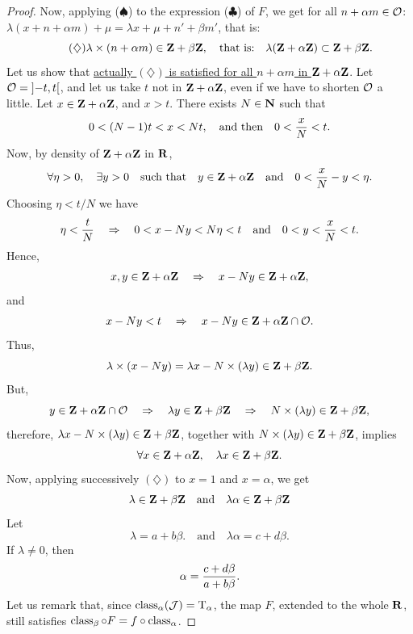 \begin{proof}
  Now, applying ($\spadesuit$) to the expression ($\clubsuit$) of $F$,
  we get for all $n + \alpha m \in \mathcal{O}$:
  $\lambda(x + n + \alpha m) + \mu = \lambda x + \mu  + n' + \beta m'$,
  that is:
  \begin{equation} \tag{$\diamondsuit$}
    \lambda \times (n + \alpha m ) \in \mathbf{Z} + \beta \mathbf{Z},
    \quad \text{that is:} \quad
    \lambda (\mathbf{Z} + \alpha \mathbf{Z}) \subset \mathbf{Z} + \beta \mathbf{Z}.
  \end{equation}
  Let us show that \uline{actually $(\diamondsuit)$ is satisfied for all $n + \alpha m$ in $\mathbf{Z} + \alpha \mathbf{Z}$}.
  Let $\mathcal{O} = \mathopen] -t,t \mathclose[$,
  and let us take $t$ not in $\mathbf{Z} + \alpha \mathbf{Z}$,
  even if we have to shorten $\mathcal{O}$ a little.
  Let $x \in \mathbf{Z} + \alpha \mathbf{Z}$,
  and $x >t$.
  There exists $N \in \mathbf{N}$ such that
  $$%
    0 < (N-1)t < x < N t,
    \quad \text{and then} \quad
    0< {x \over N} < t.
    $$%
  Now, by density of $\mathbf{Z} + \alpha \mathbf{Z}$ in $\mathbf{R}$,
  $$%
    \forall  \eta >0, \quad \exists y > 0 \quad \text{such that} \quad y \in \ZZ + \alpha \ZZ \quad \text{and} \quad 0 < {x \over N} - y < \eta.
    $$%
  Choosing $\eta < t/N$ we have
  $$%
    \eta < {t \over N} \quad \Rightarrow \quad 0 < x - N y < N \eta < t
    \quad \text{and} \quad
    0 < y < {x \over N} < t.
    $$%
  Hence,
  $$%
    x, y \in \ZZ + \alpha \ZZ \quad \Rightarrow \quad x-Ny \in \ZZ + \alpha \ZZ,
    $$%
  and
  $$%
    x - N y < t \quad \Rightarrow \quad x - N y \in \ZZ + \alpha \ZZ \cap \cO.
    $$%
  Thus,
  $$%
    \lambda \times (x- N y) = \lambda x - N \times (\lambda y) \in \ZZ + \beta \ZZ.
    $$%
  But,
  $$%
    y \in  \ZZ + \alpha \ZZ \cap \cO \quad \Rightarrow \quad \lambda y \in \ZZ + \beta \ZZ \quad \Rightarrow \quad N \times (\lambda y) \in \ZZ + \beta \ZZ,
    $$%
  therefore,
  $\lambda x - N \times (\lambda y) \in \mathbf{Z} + \beta \mathbf{Z}$,
  together with $N \times (\lambda y) \in \mathbf{Z} + \beta \mathbf{Z}$,
  implies
  $$%
    \forall x \in \ZZ + \alpha \ZZ, \quad \lambda x \in \ZZ + \beta \ZZ.
    $$%
  Now, applying successively $(\diamondsuit)$ to $x = 1$ and $x = \alpha$,
  we get
  $$%
    \lambda \in \ZZ + \beta \ZZ
    \quad \text{and} \quad
    \lambda \alpha \in \ZZ + \beta \ZZ
    $$%
  Let
  $$%
    \lambda = a + b \beta.
    \quad \text{and} \quad
    \lambda \alpha = c + d \beta.
    $$%
  If $\lambda \neq 0$,
  then
  $$%
    \alpha = {c + d \beta \over a + b \beta}.
    $$%
  Let us remark that,
  since $\operatorname{class}_\alpha(\mathcal{J}) = \mathrm{T}_\alpha$,
  the map $F$,
  extended to the whole $\mathbf{R}$,
  still satisfies $\operatorname{class}_\beta \circ F = f \circ \operatorname{class}_\alpha$.
\end{proof}

